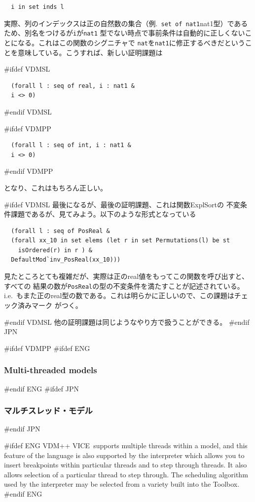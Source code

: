\documentclass[\pformat,12pt]{article}
\newcommand{\vdmslpp}{VDM-SL}
\newcommand{\Toolbox}{Toolbox}
\newcommand{\vdmslpp}{VDM++}
\newcommand{\Toolbox}{Toolbox}
\renewcommand{\vdmslpp}{VDM++ VICE}
\newcommand{\aaa}{\tt }
\newcommand{\guicmd}[1]{{\sf #1}}
\newcommand{\guicmd}[1]{{\gt #1}}
\begin{document}
\begin{verbatim}
  i in set inds l
\end{verbatim}

実際、列のインデックスは正の自然数の集合（例.\ \verb+set of nat1+nat1型）であるため、別名をつけるが{\aaa i}が{\aaa nat1}
型でない時点で事前条件は自動的に正しくないことになる。これはこの関数のシグニチャで
{\aaa nat}を{\aaa nat1}に修正するべきだということを意味している。こうすれば、新しい証明課題は

#ifdef VDMSL
\begin{verbatim}
  (forall l : seq of real, i : nat1 &
  i <> 0)
\end{verbatim}
#endif VDMSL

#ifdef VDMPP
\begin{verbatim}
  (forall l : seq of int, i : nat1 &
  i <> 0)
\end{verbatim}
#endif VDMPP

となり、これはもちろん正しい。

#ifdef VDMSL
最後になるが、最後の証明課題、これは関数\guicmd{ExplSort}の
不変条件課題であるが、見てみよう。以下のような形式となっている

\begin{verbatim}
  (forall l : seq of PosReal &
  (forall xx_10 in set elems (let r in set Permutations(l) be st 
    isOrdered(r) in r ) &
  DefaultMod`inv_PosReal(xx_10)))
\end{verbatim}

見たところとても複雑だが、実際は正のreal値をもってこの関数を呼び出すと、すべての
結果の数が{\aaa PosReal}の型の不変条件を満たすことが記述されている。i.e.\ 
もまた正のreal型の数である。これは明らかに正しいので、この課題はチェック済みマーク
がつく。

#endif VDMSL
他の証明課題は同じようなやり方で扱うことができる。
#endif JPN

#ifdef VDMPP
#ifdef ENG
\subsubsection{Multi-threaded models}
#endif ENG
#ifdef JPN
\subsubsection{マルチスレッド・モデル}
#endif JPN

#ifdef ENG
\vdmslpp\ supports multiple threads within a model, and this feature of the
language is also supported by the interpreter which allows you to
insert breakpoints within particular threads and to step
through threads. It also allows selection of a particular thread to
step through. The scheduling algorithm used by the interpreter may be
selected from a variety built into the \Toolbox.
#endif ENG
\end{document}
